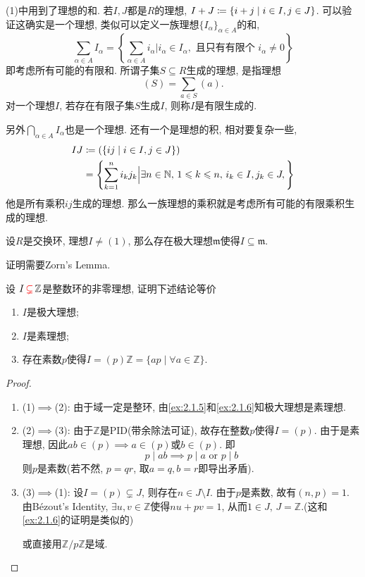 \begin{remark}
    (1)中用到了理想的和. 若$I, J$都是$R$的理想, $I + J \mathrel{\coloneqq} \{i + j \mid i \in I, j \in J\}$. 可以验证这确实是一个理想, 类似可以定义一族理想$\{I_\alpha\}_{\alpha \in A}$的和,
    \[
        \sum_{\alpha \in A} I_\alpha = \left\{\sum_{\alpha \in A} i_\alpha \Big| i_\alpha \in I_\alpha, \text{ 且只有有限个 } i_\alpha \neq 0 \right\}
    \]
    即考虑所有可能的有限和. 所谓子集$S \subseteq R$生成的理想, 是指理想
    \[
        (S) = \sum_{a \in S} (a).
    \]
    对一个理想$I$, 若存在有限子集$S$生成$I$, 则称$I$是有限生成的.
    
    另外$\bigcap_{\alpha \in A} I_\alpha$也是一个理想. 还有一个是理想的积, 相对要复杂一些,
    \[
    \begin{aligned}
        IJ &\mathrel{\coloneqq} (\{ij \mid i \in I, j \in J\})\\
        &= \left\{\sum_{k = 1}^{n} i_kj_k \Big| \exists n \in \mathbb{N},\, 1 \leqslant k \leqslant n,\, i_k \in I, j_k \in J, \right\}
    \end{aligned}
    \]
    他是所有乘积$ij$生成的理想. 那么一族理想的乘积就是考虑所有可能的有限乘积生成的理想.

    \begin{propstar}
        设$R$是交换环, 理想$I \neq (1)$, 那么存在极大理想$\mathfrak{m}$使得$I \subseteq \mathfrak{m}$.
    \end{propstar}
    证明需要Zorn's Lemma.
\end{remark}

\begin{problem}
    设 $I \,\textcolor{red}{\subsetneq}\, \mathbb{Z}$是整数环的非零理想, 证明下述结论等价
    \begin{enumerate}[(1)]
        \item $I$是极大理想;
        \item $I$是素理想;
        \item 存在素数$p$使得$I = (p)\mathbb{Z} = \{ap \mid \forall a \in \mathbb{Z}\}$.
    \end{enumerate}
\end{problem}

\begin{proof}
    \begin{enumerate}[1.]
        \item (1)$\implies$(2): 由于域一定是整环, 由\ref{ex:2.1.5}和\ref{ex:2.1.6}知极大理想是素理想.
        \item (2)$\implies$(3): 由于$\mathbb{Z}$是PID(带余除法可证), 故存在整数$p$使得$I = (p)$. 由于是素理想, 因此$ab \in (p) \implies a \in (p)$或$b \in (p)$. 即
        \[
            p \mid ab \implies p \mid a \text{ or } p \mid b
        \]
        则$p$是素数(若不然, $p = qr$, 取$a = q, b = r$即导出矛盾).
        \item (3)$\implies$(1): 设$I = (p) \subsetneq J$, 则存在$n \in J \setminus I$. 由于$p$是素数, 故有$(n, p) = 1$. 由Bézout's Identity, $\exists u, v \in \mathbb{Z}$使得$nu + pv = 1$, 从而$1 \in J,\, J = \mathbb{Z}$.(这和\ref{ex:2.1.6}的证明是类似的)
        
        或直接用$\mathbb{Z}/p\mathbb{Z}$是域.
    \end{enumerate}
\end{proof}

